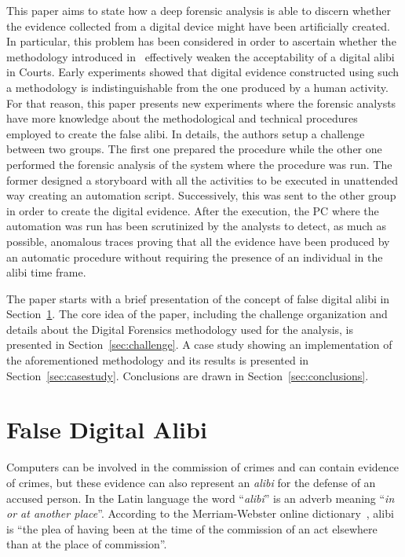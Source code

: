 \documentclass[10pt, conference]{IEEEtran}
\begin{document}
This paper aims to state how a deep forensic analysis is able to discern whether the evidence collected from a digital device might
have been artificially created. In particular, this problem has been considered in order to ascertain whether the methodology introduced
in~\cite{autoalibi} effectively weaken the acceptability of a digital alibi in Courts. 
Early experiments showed that digital evidence constructed using such a methodology is indistinguishable 
from the one produced by a human activity. For that reason, this paper presents new experiments where the forensic analysts
have more knowledge about the methodological and technical procedures employed to create the false alibi.
In details, the authors setup a challenge between two groups. The first one prepared the procedure while the other one performed
the forensic analysis of the system where the procedure was run.
The former designed a storyboard with all the activities to be executed in unattended way creating an automation script. Successively,
this was sent to the other group in order to create the digital evidence. After the execution, the PC where the automation was run has
been scrutinized by the analysts to detect, as much as possible, anomalous traces proving that all the evidence have been produced
by an automatic procedure without requiring the presence of an individual in the alibi time frame.

The paper starts with a brief presentation of the concept of false digital alibi in Section~\ref{sec:falsealibi}.
The core idea of the paper, including the challenge organization and details about the Digital Forensics
methodology used for the analysis, is presented in Section~\ref{sec:challenge}. A case study showing an 
implementation of the aforementioned methodology and its results is presented in Section~\ref{sec:casestudy}.
Conclusions are drawn in Section~\ref{sec:conclusions}.


\section{False Digital Alibi}
\label{sec:falsealibi}

Computers can be involved in the commission of crimes and can contain evidence of crimes, but these evidence can also
represent an \emph{alibi} for the defense of an accused person. In the Latin language the word ``\emph{alibi}'' is an adverb
meaning ``\emph{in or at another place}''. According to the Merriam-Webster online dictionary~\cite{webster}, alibi is ``the plea
of having been at the time of the commission of an act elsewhere than at the place of commission''.
\end{document}
